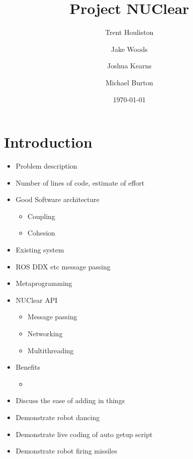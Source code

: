 \documentclass{beamer}
\title[Short title]{Project NUClear}
\author{
	Trent Houliston \and Jake Woods \and Joshua Kearns \and Michael Burton
}
\institute[UoN]
{
	University of Newcastle \\ %
	\medskip
	\textit{Trent.Houliston@uon.edu.au, Jake.f.woods@gmail.com} %
}
\date{\today}
\begin{document}
\begin{frame}
	\titlepage %
\end{frame}

\begin{frame}
	\tableofcontents
\end{frame}

\section{Introduction}
\begin{frame}
\end{frame}

\begin{itemize}
	\item Problem description
	\item Number of lines of code, estimate of effort
	\item Good Software architecture
	\begin{itemize}
		\item Coupling
		\item Cohesion
	\end{itemize}
	\item Existing system
	\item ROS DDX etc message passing
	\item Metaprogramming
	\item NUClear API
	\begin{itemize}
		\item Message passing
		\item Networking
		\item Multithreading
	\end{itemize}
	\item Benefits
	\begin{itemize}
		\item 
	\end{itemize}
	\item Discuss the ease of adding in things
	\item Demonstrate robot dancing
	\item Demonstrate live coding of auto getup script
	\item Demonstrate robot firing missiles
\end{itemize}
\end{document}
